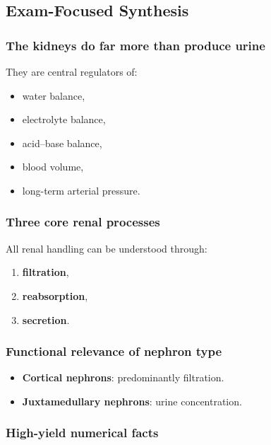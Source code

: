 \documentclass[11pt,a4paper]{article}
\begin{document}
\subsection{Exam-Focused Synthesis}

\subsubsection{The kidneys do far more than produce urine}

They are central regulators of:
\begin{itemize}
    \item water balance,
    \item electrolyte balance,
    \item acid--base balance,
    \item blood volume,
    \item long-term arterial pressure.
\end{itemize}

\subsubsection{Three core renal processes}

All renal handling can be understood through:
\begin{enumerate}
    \item \textbf{filtration},
    \item \textbf{reabsorption},
    \item \textbf{secretion}.
\end{enumerate}

\subsubsection{Functional relevance of nephron type}

\begin{itemize}
    \item \textbf{Cortical nephrons}: predominantly filtration.
    \item \textbf{Juxtamedullary nephrons}: urine concentration.
\end{itemize}

\subsubsection{High-yield numerical facts}
\end{document}
